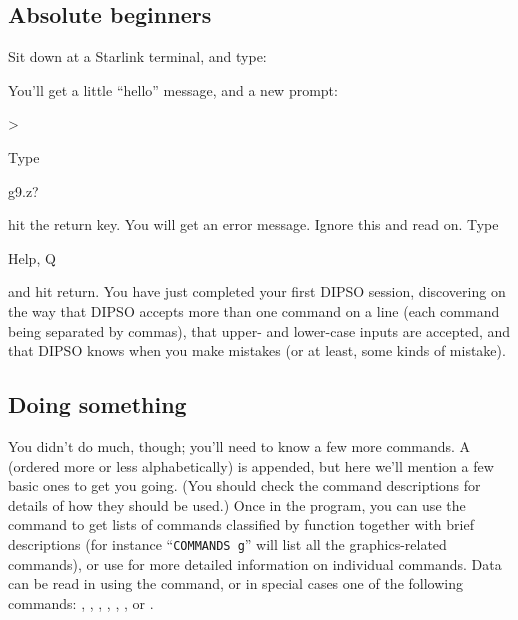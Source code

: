 \documentclass[twoside,11pt,noabs,nolof]{starlink}
\begin{document}
\subsection {Absolute beginners}
Sit down at a Starlink terminal, and type:
\begin{terminalv}
\end{terminalv}

You'll get a little ``hello'' message, and a new prompt:
\begin{terminalv}
>
\end{terminalv}
Type
\begin{terminalv}
g9.z?
\end{terminalv}
hit the return key. You will get an error message. Ignore this and
read on. Type
\begin{terminalv}
Help, Q
\end{terminalv}

and hit return. You have just completed your first DIPSO session,
discovering on the way that DIPSO accepts more than one command on a
line (each command being separated by commas), that upper- and
lower-case inputs are accepted, and that DIPSO knows when you make
mistakes (or at least, some kinds of mistake).

\subsection {Doing something}

You didn't do much, though; you'll need to know a few more commands. A
 (ordered more or less
alphabetically) is appended, but here we'll mention a few basic ones to
get you going. (You should check the command descriptions for details of
how they should be used.)
Once in the program, you can use the 
command to get lists of commands classified by function together with
brief descriptions (for instance ``\verb+COMMANDS g+'' will list all the
graphics-related commands), or use   for
more detailed information on individual commands.
Data can be read in using the   command, or
in special cases one of the following commands: , ,
,  ,
,  ,
or .
\end{document}
